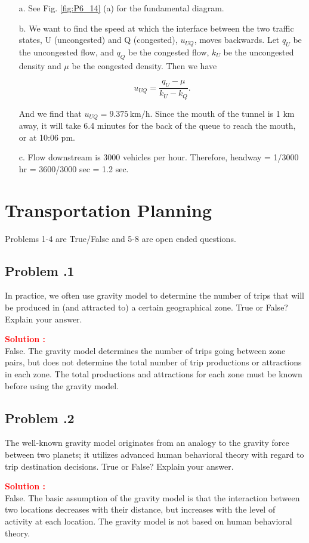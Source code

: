 \documentclass[12pt]{article}
\newcommand{\customsubsection}[1]{
  \subsection*{Problem \thesection.#1}
}
\begin{document}
\begin{enumerate}
    \item [a.] See Fig. \ref{fig:P6_14} (a) for the fundamental diagram.

    \item [b.] We want to find the speed at which the interface between the two traffic states, U (uncongested) and Q (congested), \(u_{UQ}\), moves backwards. Let \(q_U\) be the uncongested flow, and \(q_Q\) be the congested flow, \(k_U\) be the uncongested density and \(\mu\) be the congested density. Then we have

\[
u_{UQ} = \frac{q_U - \mu}{k_U - k_Q}.
\]

And we find that \(u_{UQ} = 9.375 \, \text{km/h}\). Since the mouth of the tunnel is 1 km away, it will take 6.4 minutes for the back of the queue to reach the mouth, or at 10:06 pm.


    \item [c.] Flow downstream is 3000 vehicles per hour. Therefore, headway = 1/3000 hr = 3600/3000 sec = 1.2 sec.

\end{enumerate}



\newpage



\section{Transportation Planning}
Problems 1-4 are True/False and 5-8 are open ended questions.

\customsubsection{1}
In practice, we often use gravity model to determine the number of trips that will be produced in (and attracted to) a certain geographical zone. True or False? Explain your answer. 


\textbf{\textcolor{red}{Solution :}} \\
False. The gravity model determines the number of trips going between zone pairs, but does not determine the total number of trip productions or attractions in each zone. The total productions and attractions for each zone must be known before using the gravity model.
\newpage

\customsubsection{2}
The well-known gravity model originates from an analogy to the gravity force between two planets; it utilizes advanced human behavioral theory with regard to trip destination decisions. True or False? Explain your answer. 


\textbf{\textcolor{red}{Solution :}} \\
False. The basic assumption of the gravity model is that the interaction between two locations decreases with their distance, but increases with the level of activity at each location. The gravity model is not based on human behavioral theory.
\newpage
\end{document}
